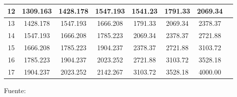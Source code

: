 \begin{enumerate}
\begin{enumerate}
\begin{center}
\begin{table}[h]
{\begin{tabular}{|c|c|c|c|c|c|c|c|}
\hline 
{\small 12} & {\small 1309.163} & {\small 1428.178} & {\small 1547.193} & {\small 1541.23} & {\small 1791.33} & {\small 2069.34}  \\ 
\hline 
{\small 13} & {\small 1428.178} & {\small 1547.193} & {\small 1666.208} & {\small 1791.33} & {\small 2069.34} & {\small 2378.37}  \\ 
\hline 
{\small 14} & {\small 1547.193} & {\small 1666.208} & {\small 1785.223} & {\small 2069.34} & {\small 2378.37} & {\small 2721.88}  \\ 
\hline 
{\small 15} & {\small 1666.208} & {\small 1785.223} & {\small 1904.237} & {\small 2378.37} & {\small 2721.88} & {\small 3103.72}  \\ 
\hline 
{\small 16} & {\small 1785.223} & {\small 1904.237} & {\small 2023.252} & {\small 2721.88} & {\small 3103.72} & {\small 3528.18}  \\ 
\hline 
{\small 17} & {\small 1904.237} & {\small 2023.252} & {\small 2142.267} & {\small 3103.72} & {\small 3528.18} & {\small 4000.00}  \\ 
\hline 
\end{tabular} 
}
\begin{center}
\vskip 0.2cm
{\small{Fuente: \cite{eyra}}}
\end{center}
\end{table}
\end{center}


\end{enumerate}
\end{enumerate}
